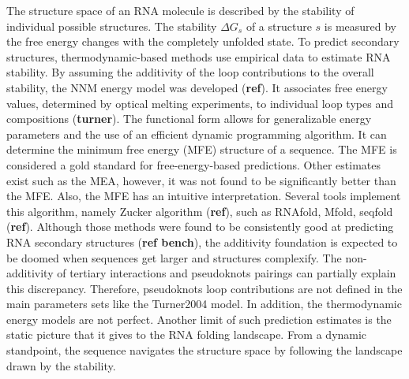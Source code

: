 \documentclass[a4paper,12pt]{article}
\begin{document}
The structure space of an RNA molecule is described by the stability of
individual possible structures. The stability \(\Delta G_s\) of a structure \(s\) is
measured by the free energy changes with the completely unfolded state. To
predict secondary structures, thermodynamic-based methods use empirical data to
estimate RNA stability. By assuming the additivity of the loop contributions to
the overall stability, the NNM energy model was developed (\textbf{ref}). It associates
free energy values, determined by optical melting experiments, to individual
loop types and compositions (\textbf{turner}). The functional form allows for
generalizable energy parameters and the use of an efficient dynamic programming
algorithm. It can determine the minimum free energy (MFE) structure of a
sequence. The MFE is considered a gold standard for free-energy-based
predictions. Other estimates exist such as the MEA, however, it was not found to
be significantly better than the MFE. Also, the MFE has an intuitive
interpretation. Several tools implement this algorithm, namely Zucker algorithm
(\textbf{ref}), such as RNAfold, Mfold, seqfold (\textbf{ref}). Although those methods were
found to be consistently good at predicting RNA secondary structures (\textbf{ref
bench}), the additivity foundation is expected to be doomed when sequences get
larger and structures complexify. The non-additivity of tertiary interactions
and pseudoknots pairings can partially explain this discrepancy. Therefore,
pseudoknots loop contributions are not defined in the main parameters sets like
the Turner2004 model. In addition, the thermodynamic energy models are not
perfect. Another limit of such prediction estimates is the static picture that
it gives to the RNA folding landscape. From a dynamic standpoint, the sequence
navigates the structure space by following the landscape drawn by the stability.
\end{document}

